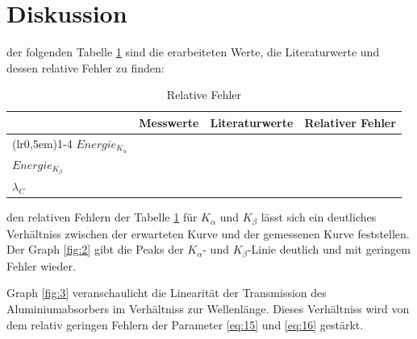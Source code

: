 \newpage
\section{Diskussion}

    \justifying der folgenden Tabelle \ref{tab:3} sind die erarbeiteten Werte, die Literaturwerte und dessen relative Fehler zu finden:

    \begin{table}[H]
    \centering
        \begin{tabular}{l l c r}
            \toprule
            \multicolumn{1}{c}{} & \multicolumn{1}{c}{Messwerte} & \multicolumn{1}{c}{Literaturwerte} & \multicolumn{1}{c}{Relativer Fehler}\\
            \cmidrule(lr{0,5em}){1-4}
            $Energie_{K_{\alpha}}$           &             &  \cite{NIST}            &  \\
            $Energie_{K_{\beta}}$            &             &  \cite{NIST}            &  \\
            $\lambda_C$                      &             &  \cite{scipy}           &  \\
            \bottomrule
        \end{tabular}
    \caption{Relative Fehler}
    \label{tab:3}
    \end{table}

    \justifying den relativen Fehlern der Tabelle \ref{tab:3} für $K_{\alpha}$ und $K_{\beta}$ lässt sich ein deutliches Verhältniss zwischen der
    erwarteten Kurve und der gemessenen Kurve feststellen. Der Graph \ref{fig:2} gibt die Peaks der $K_{\alpha}$- und $K_{\beta}$-Linie deutlich und mit geringem 
    Fehler wieder. 

    \justifying Graph \ref{fig:3} veranschaulicht die Linearität der Transmission des Aluminiumabsorbers im Verhältniss zur Wellenlänge. Dieses Verhältniss
    wird von dem relativ geringen Fehlern der Parameter \eqref{eq:15} und \eqref{eq:16} gestärkt. 

